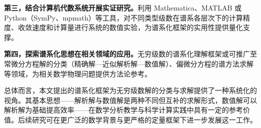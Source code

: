 \textbf{第三，结合计算机代数系统开展实证研究。}利用 Mathematica、MATLAB 或 Python（SymPy、mpmath）等工具，对不同类型级数在谱系各层次下的计算精度、收敛速度和计算量进行系统的数值实验，为谱系化框架的实用性提供量化支撑。

\textbf{第四，探索谱系化思想在相关领域的应用。}无穷级数的谱系化理解框架或可推广至常微分方程解的分类（精确解—近似解析解—数值解）、偏微分方程的谱方法求解等领域，为相关数学物理问题提供方法论参考。

总体而言，本文提出的谱系化框架为无穷级数解的分类与求解提供了一种系统化的视角。其基本思想——解析解与数值解是两种不同但互补的求解形式，数值解可以解析解为基础提高效率——在数学分析教学与科学计算实践中具有一定的参考价值。后续研究可在更广泛的数学背景与更严格的定量框架下进一步发展这一工作。
